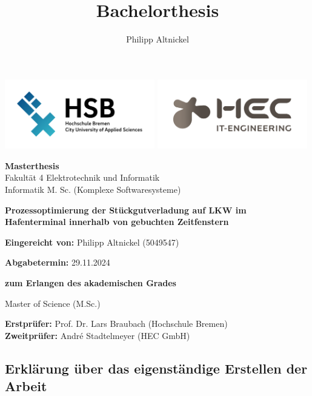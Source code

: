 \vfill\documentclass[12pt]{extarticle}
\title{Bachelorthesis}
\author{Philipp Altnickel}
\begin{document}
\begin{titlepage}
	\centering
	\includegraphics[width=0.49\textwidth]{Logo_HSB_Hochschule_Bremen.png}
	\includegraphics[width=0.49\textwidth]{Logo_HEC.png}
	\par
	\vspace{2cm}
	{\large \textbf{Masterthesis}\\Fakultät 4 Elektrotechnik und Informatik\\Informatik M. Sc. (Komplexe Softwaresysteme)\par}
	\vspace{2cm}
	{\LARGE\bfseries Prozessoptimierung der Stückgutverladung auf LKW im Hafenterminal innerhalb von gebuchten Zeitfenstern\par}
	\vspace{3cm}
	{\large \textbf{Eingereicht von:} Philipp Altnickel (5049547)\par}
	{\large \textbf{Abgabetermin:} 29.11.2024\par}
	\vspace{1cm}
	{\large \bfseries zum Erlangen des akademischen Grades\par\LARGE Master of Science (M.Sc.)\par}
	
	\vfill
	
	{\large \textbf{Erstprüfer:} Prof. Dr. Lars Braubach (Hochschule Bremen)\\\textbf{Zweitprüfer:} André Stadtelmeyer (HEC GmbH)\par}
\end{titlepage}
\newpage

\setcounter{page}{2}

\subsection*{Erklärung über das eigenständige Erstellen der Arbeit}
\end{document}
